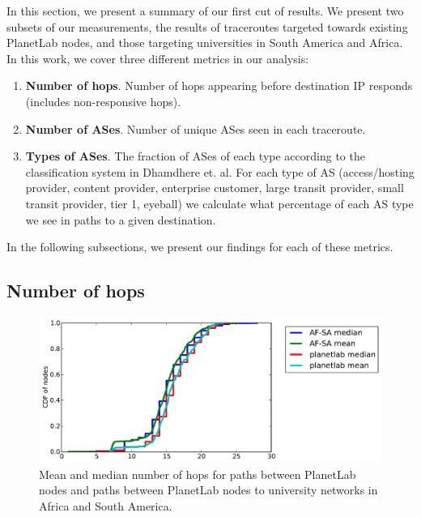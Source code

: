 \documentclass{sig-alternate-10pt}
\begin{document}
In this section, we present a summary of our first cut of results. We
present two subsets of our measurements, the results of traceroutes targeted
towards existing PlanetLab nodes, and those targeting universities in South
America and Africa. In this work, we cover three different metrics in our
analysis:

\begin{enumerate}

\item \textbf{Number of hops}. Number of hops appearing before destination IP
responds (includes non-responsive hops).

\item \textbf{Number of ASes}. Number of unique ASes seen in each traceroute.

\item \textbf{Types of ASes}. The fraction of ASes of each type according to
the classification system in Dhamdhere et. al.  For each type of AS
(access/hosting provider, content provider, enterprise customer, large transit
provider, small transit provider, tier 1, eyeball) we calculate what percentage
of each AS type we see in paths to a given destination.

\end{enumerate}

In the following subsections, we present our findings for each of these
metrics.

\subsection{Number of hops}

\begin{figure}
\centering
    \includegraphics[width=1.0\linewidth]{figs/number_of_hops.pdf}
    \caption{Mean and median number of hops for paths between PlanetLab nodes and 
paths between PlanetLab nodes to university networks in Africa and South America.}
    \label{fig:num_hops}
\end{figure}
\end{document}
